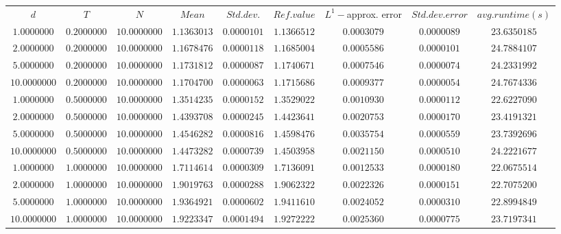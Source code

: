 \begin{tabular}{ccccccccc}
$d$ & $T$ & $N$ & $Mean$ & $Std. dev.$ & $Ref. value$ & $L^1-$approx. error & $Std. dev. error$ & $avg. runtime (s)$\\
$1.0000000$ & $0.2000000$ & $10.0000000$ & $1.1363013$ & $0.0000101$ & $1.1366512$ & $0.0003079$ & $0.0000089$ & $23.6350185$\\
$2.0000000$ & $0.2000000$ & $10.0000000$ & $1.1678476$ & $0.0000118$ & $1.1685004$ & $0.0005586$ & $0.0000101$ & $24.7884107$\\
$5.0000000$ & $0.2000000$ & $10.0000000$ & $1.1731812$ & $0.0000087$ & $1.1740671$ & $0.0007546$ & $0.0000074$ & $24.2331992$\\
$10.0000000$ & $0.2000000$ & $10.0000000$ & $1.1704700$ & $0.0000063$ & $1.1715686$ & $0.0009377$ & $0.0000054$ & $24.7674336$\\
$1.0000000$ & $0.5000000$ & $10.0000000$ & $1.3514235$ & $0.0000152$ & $1.3529022$ & $0.0010930$ & $0.0000112$ & $22.6227090$\\
$2.0000000$ & $0.5000000$ & $10.0000000$ & $1.4393708$ & $0.0000245$ & $1.4423641$ & $0.0020753$ & $0.0000170$ & $23.4191321$\\
$5.0000000$ & $0.5000000$ & $10.0000000$ & $1.4546282$ & $0.0000816$ & $1.4598476$ & $0.0035754$ & $0.0000559$ & $23.7392696$\\
$10.0000000$ & $0.5000000$ & $10.0000000$ & $1.4473282$ & $0.0000739$ & $1.4503958$ & $0.0021150$ & $0.0000510$ & $24.2221677$\\
$1.0000000$ & $1.0000000$ & $10.0000000$ & $1.7114614$ & $0.0000309$ & $1.7136091$ & $0.0012533$ & $0.0000180$ & $22.0675514$\\
$2.0000000$ & $1.0000000$ & $10.0000000$ & $1.9019763$ & $0.0000288$ & $1.9062322$ & $0.0022326$ & $0.0000151$ & $22.7075200$\\
$5.0000000$ & $1.0000000$ & $10.0000000$ & $1.9364921$ & $0.0000602$ & $1.9411610$ & $0.0024052$ & $0.0000310$ & $22.8994849$\\
$10.0000000$ & $1.0000000$ & $10.0000000$ & $1.9223347$ & $0.0001494$ & $1.9272222$ & $0.0025360$ & $0.0000775$ & $23.7197341$\\
\end{tabular}
